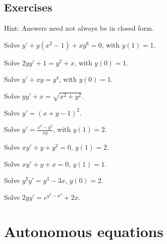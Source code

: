 \documentclass[12pt]{book}
\begin{document}
\subsection{Exercises}

Hint: Answers need not always be in closed form.

\begin{exercise}
Solve
$y'+ y(x^2-1)+xy^6 = 0$, with $y(1)=1$.
\end{exercise}

\begin{exercise}
Solve $2yy' + 1 = y^2 + x$, with $y(0)=1$.
\end{exercise}

\begin{exercise}
Solve $y' + xy = y^4$, with $y(0)=1$.
\end{exercise}

\begin{exercise}
Solve $yy' + x = \sqrt{x^2 + y^2}$.
\end{exercise}

\begin{exercise}
Solve $y' = {(x+y-1)}^2$.
\end{exercise}

\begin{exercise}
Solve $y' = \frac{x^2-y^2}{x y}$, with $y(1) = 2$.
\end{exercise}

\setcounter{exercise}{100}

\begin{exercise}
Solve $xy'+y+y^2 = 0$, $y(1)=2$.
\end{exercise}

\begin{exercise}
Solve $xy'+y +x = 0$, $y(1)=1$.
\end{exercise}

\begin{exercise}
Solve $y^2y' = y^3-3x$, $y(0)=2$.
\end{exercise}

\begin{exercise}
Solve $2yy' = e^{y^2-x^2} + 2x$.
\end{exercise}


\sectionnewpage
\section{Autonomous equations}
\label{auteq:section}
\end{document}
